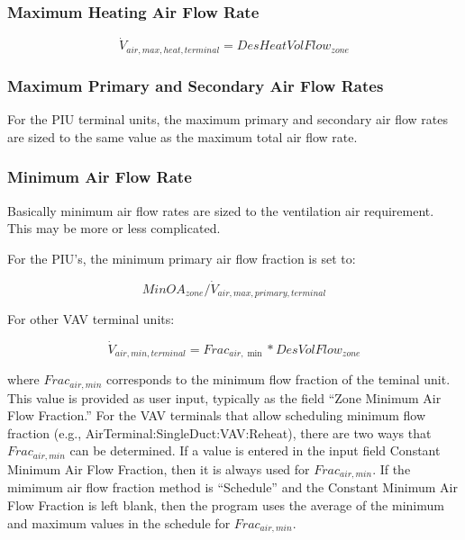 \subsubsection{Maximum Heating Air Flow Rate}\label{maximum-heating-air-flow-rate}

\begin{equation}
{\dot V_{air,max,heat,terminal}} = DesHeatVolFlow_{zone}
\end{equation}

\subsubsection{Maximum Primary and Secondary Air Flow Rates}\label{maximum-primary-and-secondary-air-flow-rates}

For the PIU terminal units, the maximum primary and secondary air flow rates are sized to the same value as the maximum total air flow rate.

\subsubsection{Minimum Air Flow Rate}\label{minimum-air-flow-rate}

Basically minimum air flow rates are sized to the ventilation air requirement. This may be more or less complicated.

For the PIU's, the minimum primary air flow fraction is set to:

\begin{equation}
{MinOA}_{zone} /{\dot V_{air,max,primary,terminal}}
\end{equation}

For other VAV terminal units:

\begin{equation}
{\dot V_{air,min,terminal}} = Fra{c_{air,\min }}*DesVolFlow_{zone}
\end{equation}

where \emph{\(Frac_{air,min}\)} corresponds to the minimum flow fraction of the teminal unit. This value is provided as user input, typically as the field ``Zone Minimum Air Flow Fraction.'' For the VAV terminals that allow scheduling minimum flow fraction (e.g., AirTerminal:SingleDuct:VAV:Reheat), there are two ways that \emph{\(Frac_{air,min}\)} can be determined. If a value is entered in the input field Constant Minimum Air Flow Fraction, then it is always used for \emph{\(Frac_{air,min}\)}. If the mimimum air flow fraction method is ``Schedule'' and the Constant Minimum Air Flow Fraction is left blank, then the program uses the average of the minimum and maximum values in the schedule for \emph{\(Frac_{air,min}\)}.

